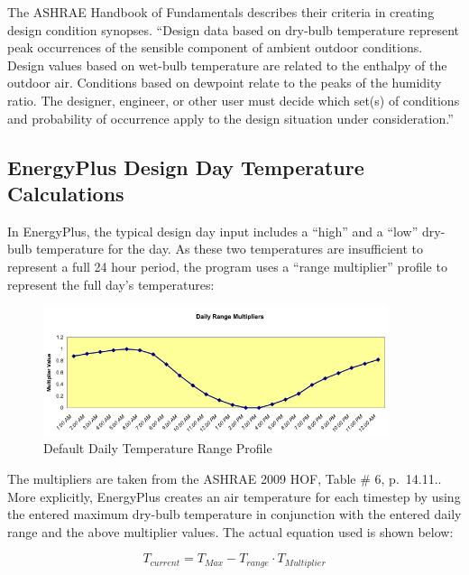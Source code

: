 The ASHRAE Handbook of Fundamentals describes their criteria in creating design condition synopses. ``Design data based on dry-bulb temperature represent peak occurrences of the sensible component of ambient outdoor conditions. Design values based on wet-bulb temperature are related to the enthalpy of the outdoor air. Conditions based on dewpoint relate to the peaks of the humidity ratio. The designer, engineer, or other user must decide which set(s) of conditions and probability of occurrence apply to the design situation under consideration.''

\subsection{EnergyPlus Design Day Temperature Calculations}\label{energyplus-design-day-temperature-calculations}

In EnergyPlus, the typical design day input includes a ``high'' and a ``low'' dry-bulb temperature for the day. As these two temperatures are insufficient to represent a full 24 hour period, the program uses a ``range multiplier'' profile to represent the full day's temperatures:

\begin{figure}[hbtp] %
\centering
\includegraphics[width=0.9\textwidth, height=0.9\textheight, keepaspectratio=true]{media/image563.svg.png}
\caption{Default Daily Temperature Range Profile \protect \label{fig:default-daily-temperature-range-profile}}
\end{figure}

The multipliers are taken from the ASHRAE 2009 HOF, Table \# 6, p.~14.11.. More explicitly, EnergyPlus creates an air temperature for each timestep by using the entered maximum dry-bulb temperature in conjunction with the entered daily range and the above multiplier values. The actual equation used is shown below:

\begin{equation}
{T_{current}} = {T_{Max}} - {T_{range}}\cdot {T_{Multiplier}}
\end{equation}

